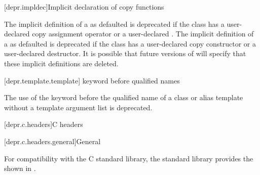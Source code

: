 [depr.impldec]{Implicit declaration of copy functions}

\pnum
The implicit definition of a 
as defaulted is deprecated if the class has
a user-declared copy assignment operator or
a user-declared .
The implicit definition of a 
as defaulted is deprecated if the class has
a user-declared copy constructor or
a user-declared destructor.
It is possible that future versions of \Cpp{} will specify
that these implicit definitions are deleted.

[depr.template.template]{ keyword before qualified names}

\pnum
The use of the keyword 
before the qualified name of a class or alias template
without a template argument list is deprecated.

[depr.c.headers]{C headers}

[depr.c.headers.general]{General}

\pnum
For compatibility with the
%
C standard library, the \Cpp{} standard library provides
the  shown in .

